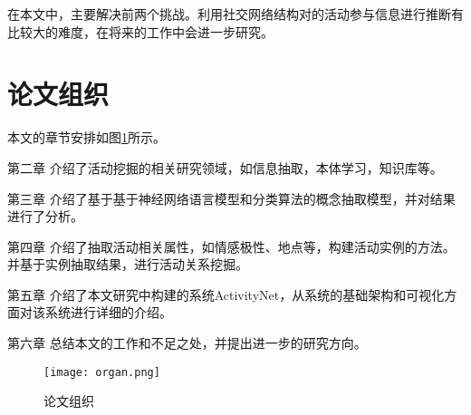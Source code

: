 在本文中，主要解决前两个挑战。利用社交网络结构对的活动参与信息进行推断有比较大的难度，在将来的工作中会进一步研究。

\section{论文组织}
本文的章节安排如图\ref{fig:organ}所示。

{\heiti 第二章} 介绍了活动挖掘的相关研究领域，如信息抽取，本体学习，知识库等。

{\heiti 第三章} 介绍了基于基于神经网络语言模型和分类算法的概念抽取模型，并对结果进行了分析。

{\heiti 第四章} 介绍了抽取活动相关属性，如情感极性、地点等，构建活动实例的方法。并基于实例抽取结果，进行活动关系挖掘。

{\heiti 第五章} 介绍了本文研究中构建的系统ActivityNet，从系统的基础架构和可视化方面对该系统进行详细的介绍。

{\heiti 第六章} 总结本文的工作和不足之处，并提出进一步的研究方向。

\begin{figure}[!h]
\caption{论文组织}
\label{fig:organ}
\begin{center}
\texttt{[image: organ.png]}
\end{center}
\end{figure}

